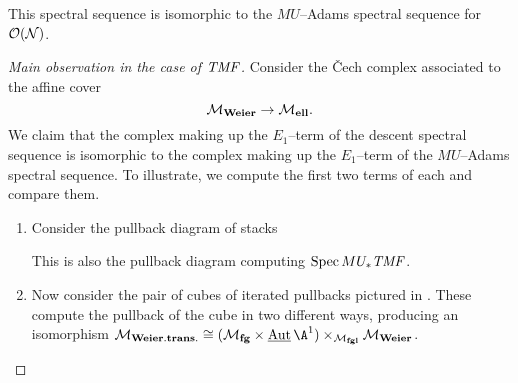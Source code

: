 \begin{lemma}
This spectral sequence is isomorphic to the \(MU\)--Adams spectral sequence for \(\mathcal{O}(\mathcal{N})\).
\end{lemma}
\begin{proof}[{Main observation in the case of \(\mathit{TMF}\)}]
Consider the \v{C}ech complex associated to the affine cover \[\mathcal{M}_{\mathbf{Weier}} \to \mathcal{M}_{\mathbf{ell}}.\]  We claim that the complex making up the \(E_1\)--term of the descent spectral sequence is isomorphic to the complex making up the \(E_1\)--term of the \(MU\)--Adams spectral sequence.  To illustrate, we compute the first two terms of each and compare them.
\begin{enumerate}
    \item Consider the pullback diagram of stacks
    \begin{center}
    \end{center}
    This is also the pullback diagram computing \(\operatorname{Spec} MU_* \mathit{TMF}\).
    \item Now consider the pair of cubes of iterated pullbacks pictured in .  These compute the pullback of the cube in two different ways, producing an isomorphism \(\moduli{Weier.trans.} \cong (\moduli{fg} \times \InternalAut{\A^1}) \times_{\moduli{fgl}} \moduli{Weier}\).
\begin{figure}
    \begin{center}
     \hspace{1em}

\end{center}
\end{figure}
\end{enumerate}
\end{proof}
